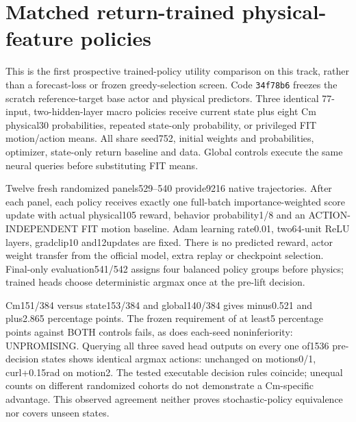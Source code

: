\documentclass[10pt]{article}
\begin{document}
\section{Matched return-trained physical-feature policies}
This is the first prospective trained-policy utility comparison on this track,
rather than a forecast-loss or frozen greedy-selection screen. Code
\texttt{34f78b6} freezes the scratch reference-target base actor and physical
predictors. Three identical 77-input, two-hidden-layer macro policies receive
current state plus eight Cm physical30 probabilities, repeated state-only
probability, or privileged FIT motion/action means. All share seed752, initial
weights and probabilities, optimizer, state-only return baseline and data.
Global controls execute the same neural queries before substituting FIT means.

Twelve fresh randomized panels529--540 provide9216 native trajectories. After
each panel, each policy receives exactly one full-batch importance-weighted score
update with actual physical105 reward, behavior probability1/8 and an
ACTION-INDEPENDENT FIT motion baseline. Adam learning rate0.01, two64-unit ReLU
layers, gradclip10 and12updates are fixed. There is no predicted reward, actor
weight transfer from the official model, extra replay or checkpoint selection.
Final-only evaluation541/542 assigns four balanced policy groups before physics;
trained heads choose deterministic argmax once at the pre-lift decision.

\begin{table}[ht]\centering

\caption{Fresh physical105 counts for executed policies. Each all-motion policy
has384 trajectories; each seed192 and each motion128. All motions are retained.
Single optimization seed: exploratory Probe only.}
\end{table}

Cm151/384 versus state153/384 and global140/384 gives minus0.521 and plus2.865
percentage points. The frozen requirement of at least5 percentage points against
BOTH controls fails, as does each-seed noninferiority: UNPROMISING. Querying all
three saved head outputs on every one of1536 pre-decision states shows identical
argmax actions: unchanged on motions0/1, curl+0.15rad on motion2. The tested
executable decision rules coincide; unequal counts on different randomized
cohorts do not demonstrate a Cm-specific advantage. This observed agreement
neither proves stochastic-policy equivalence nor covers unseen states.
\end{document}
